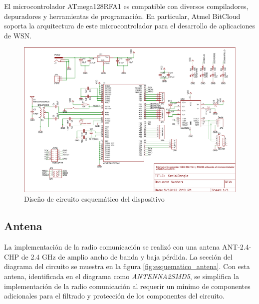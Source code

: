 El microcontrolador ATmega128RFA1 es compatible con diversos compiladores, depuradores y herramientas de programación. En particular, Atmel BitCloud soporta la arquitectura de este microcontrolador para el desarrollo de aplicaciones de WSN.

\begin{landscape}

\begin{figure}
	\includegraphics[scale=0.8]{capitulo_3_imgs/esquematico_completo.pdf}
	\caption{Diseño de circuito esquem\'atico del dispositivo}
	\label{fig:esquematico_completo}

\end{figure}

\end{landscape}

\subsection{Antena}

La implementación de la radio comunicación se realizó con una antena ANT-2.4-CHP de 2.4 GHz de amplio ancho de banda y baja pérdida\cite{dev:antena}. La sección del diagrama del circuito se muestra en la figura \ref{fig:esquematico_antena}. Con esta antena, identificada en el diagrama como \textit{ANTENNA2SMD5}, se simplifica la implementación de la radio comunicación al requerir un mínimo de componentes adicionales para el filtrado y protección de los componentes del circuito. 

